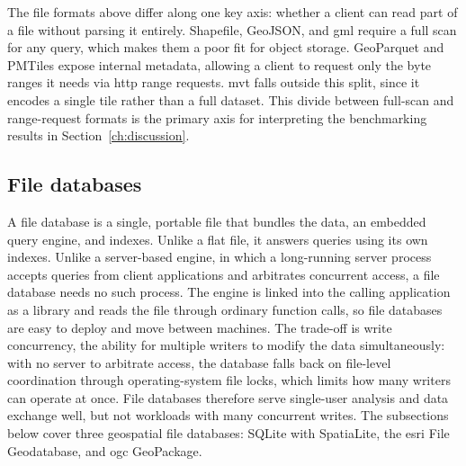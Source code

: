 The file formats above differ along one key axis: whether a client can read part of a file without parsing it entirely. Shapefile, GeoJSON, and \acrshort{gml} require a full scan for any query, which makes them a poor fit for object storage. GeoParquet and PMTiles expose internal metadata, allowing a client to request only the byte ranges it needs via \acrshort{http} range requests. \acrshort{mvt} falls outside this split, since it encodes a single tile rather than a full dataset. This divide between full-scan and range-request formats is the primary axis for interpreting the benchmarking results in Section~\ref{ch:discussion}.

\subsection{File databases}
\label{background:spatial-data-formats-and-storage-models:file-databases}
A file database is a single, portable file that bundles the data, an embedded query engine, and indexes. Unlike a flat file, it answers queries using its own indexes. Unlike a server-based engine, in which a long-running server process accepts queries from client applications and arbitrates concurrent access, a file database needs no such process. The engine is linked into the calling application as a library and reads the file through ordinary function calls, so file databases are easy to deploy and move between machines. The trade-off is write concurrency, the ability for multiple writers to modify the data simultaneously: with no server to arbitrate access, the database falls back on file-level coordination through operating-system file locks, which limits how many writers can operate at once. File databases therefore serve single-user analysis and data exchange well, but not workloads with many concurrent writes. The subsections below cover three geospatial file databases: SQLite with SpatiaLite, the \acrshort{esri} File Geodatabase, and \acrshort{ogc} GeoPackage.


